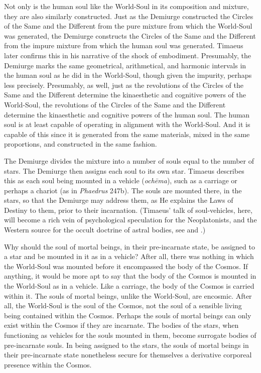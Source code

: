 Not only is the human soul like the World-Soul in its composition and mixture, they are also similarly constructed. Just as the Demiurge constructed the Circles of the Same and the Different from the pure mixture from which the World-Soul was generated, the Demiurge constructs the Circles of the Same and the Different from the impure mixture from which the human soul was generated. Timaeus later confirms this in his narrative of the shock of embodiment. Presumably, the Demiurge marks the same geometrical, arithmetical, and harmonic intervals in the human soul as he did in the World-Soul, though given the impurity, perhaps less precisely. Presumably, as well, just as the revolutions of the Circles of the Same and the Different determine the kinaesthetic and cognitive powers of the World-Soul, the revolutions of the Circles of the Same and the Different determine the kinaesthetic and cognitive powers of the human soul. The human soul is at least capable of operating in alignment with the World-Soul. And it is capable of this since it is generated from the same materials, mixed in the same proportions, and constructed in the same fashion.

The Demiurge divides the mixture into a number of souls equal to the number of stars. The Demiurge then assigns each soul to its own star. Timaeus describes this as each soul being mounted in a vehicle (\emph{ochēma}), such as a carriage or perhaps a chariot (as in \emph{Phaedrus} 247b). The souls are mounted there, in the stars, so that the Demiurge may address them, as He explains the Laws of Destiny to them, prior to their incarnation. (Timaeus' talk of soul-vehicles, here, will become a rich vein of psychological speculation for the Neoplatonists, and the Western source for the occult doctrine of astral bodies, see \citealt[appendix 2]{Dodds:1963ul} and \citealt{Finamore:1985aa}.) 

Why should the soul of mortal beings, in their pre-incarnate state, be assigned to a star and be mounted in it as in a vehicle? After all, there was nothing in which the World-Soul was mounted before it encompassed the body of the Cosmos. If anything, it would be more apt to say that the body of the Cosmos is mounted in the World-Soul as in a vehicle. Like a carriage, the body of the Cosmos is carried within it. The souls of mortal beings, unlike the World-Soul, are encosmic. After all, the World-Soul is the soul of the Cosmos, not the soul of a sensible living being contained within the Cosmos. Perhaps the souls of mortal beings can only exist within the Cosmos if they are incarnate. The bodies of the stars, when functioning as vehicles for the souls mounted in them, become surrogate bodies of pre-incarnate souls. In being assigned to the stars, the souls of mortal beings in their pre-incarnate state nonetheless secure for themselves a derivative corporeal presence within the Cosmos. 

